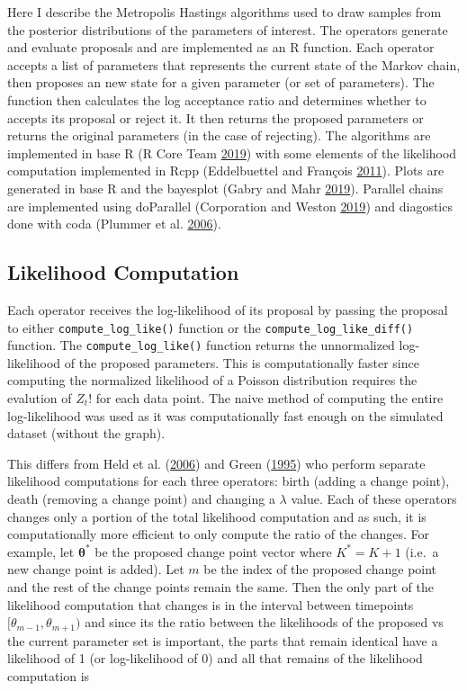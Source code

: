 \documentclass[11pt,a4paper]{article}
\numberwithin{equation}{section}
\begin{document}
Here I describe the Metropolis Hastings algorithms used to draw samples
from the posterior distributions of the parameters of interest. The
operators generate and evaluate proposals and are implemented as an R
function. Each operator accepts a list of parameters that represents the
current state of the Markov chain, then proposes an new state for a
given parameter (or set of parameters). The function then calculates the
log acceptance ratio and determines whether to accepts its proposal or
reject it. It then returns the proposed parameters or returns the
original parameters (in the case of rejecting). The algorithms are
implemented in base R (R Core Team
\protect\hyperlink{ref-r_core_team_r:_2019}{2019}) with some elements of
the likelihood computation implemented in Rcpp (Eddelbuettel and
François \protect\hyperlink{ref-eddelbuettel_rcpp:_2011}{2011}). Plots
are generated in base R and the bayesplot (Gabry and Mahr
\protect\hyperlink{ref-gabry_bayesplot:_2019}{2019}). Parallel chains
are implemented using doParallel (Corporation and Weston
\protect\hyperlink{ref-corporation_doparallel:_2019}{2019}) and
diagostics done with coda (Plummer et al.
\protect\hyperlink{ref-plummer_coda:_2006}{2006}).

\hypertarget{likelihood-computation}{%
\subsection{Likelihood Computation}\label{likelihood-computation}}

Each operator receives the log-likelihood of its proposal by passing the
proposal to either \texttt{compute\_log\_like()} function or the
\texttt{compute\_log\_like\_diff()} function. The
\texttt{compute\_log\_like()} function returns the unnormalized
log-likelihood of the proposed parameters. This is computationally
faster since computing the normalized likelihood of a Poisson
distribution requires the evalution of \(Z_{t}!\) for each data point.
The naive method of computing the entire log-likelihood was used as it
was computationally fast enough on the simulated dataset (without the
graph).

This differs from Held et al.
(\protect\hyperlink{ref-held_two-component_2006}{2006}) and Green
(\protect\hyperlink{ref-green_reversible_1995}{1995}) who perform
separate likelihood computations for each three operators: birth (adding
a change point), death (removing a change point) and changing a
\(\lambda\) value. Each of these operators changes only a portion of the
total likelihood computation and as such, it is computationally more
efficient to only compute the ratio of the changes. For example, let
\(\boldsymbol{\theta^*}\) be the proposed change point vector where
\(K^* = K + 1\) (i.e.~a new change point is added). Let \(m\) be the
index of the proposed change point and the rest of the change points
remain the same. Then the only part of the likelihood computation that
changes is in the interval between timepoints
\([\theta_{m-1}, \theta_{m+1})\) and since its the ratio between the
likelihoods of the proposed vs the current parameter set is important,
the parts that remain identical have a likelihood of 1 (or
log-likelihood of 0) and all that remains of the likelihood computation
is
\end{document}
